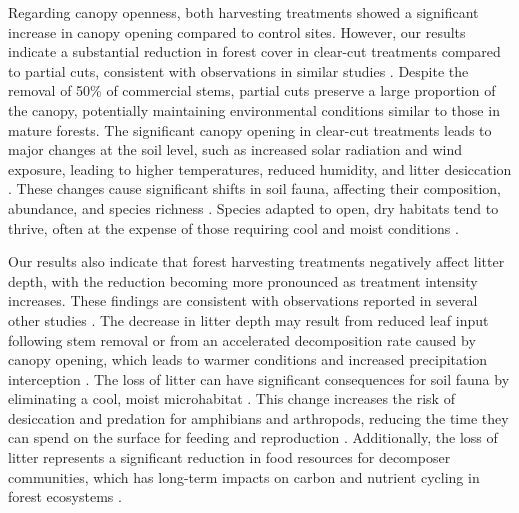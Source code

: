 
Regarding canopy openness, both harvesting treatments showed a significant increase in canopy opening compared to control sites.  
However, our results indicate a substantial reduction in forest cover in clear-cut treatments compared to partial cuts, consistent with observations in similar studies \citep{Nolet2018Comparingeffects,Mazerolle2021Woodlandsalamander}.  
Despite the removal of 50\% of commercial stems, partial cuts preserve a large proportion of the canopy, potentially maintaining environmental conditions similar to those in mature forests.  
The significant canopy opening in clear-cut treatments leads to major changes at the soil level, such as increased solar radiation and wind exposure, leading to higher temperatures, reduced humidity, and litter desiccation \citep{Keenan1993ecologicaleffects,Chen1999MicroclimateForest,Lindo2003Microbialbiomass,Brooks2008Forestfloor}.  
These changes cause significant shifts in soil fauna, affecting their composition, abundance, and species richness \citep{Staab2023Insectdecline}.  
Species adapted to open, dry habitats tend to thrive, often at the expense of those requiring cool and moist conditions \citep{Niemela2007effectsforestry,Ochs2022Responseterrestrial,Staab2023Insectdecline}.




Our results also indicate that forest harvesting treatments negatively affect litter depth, with the reduction becoming more pronounced as treatment intensity increases.  
These findings are consistent with observations reported in several other studies \citep{Marshall2000Impactsforest,Mazerolle2021Woodlandsalamander}.  
The decrease in litter depth may result from reduced leaf input following stem removal or from an accelerated decomposition rate caused by canopy opening, 
which leads to warmer conditions and increased precipitation interception \citep{Fierer2005LitterQuality,Butenschoen2011Interactiveeffects,Ameray2021Forestcarbon}.  
The loss of litter can have significant consequences for soil fauna by eliminating a cool, moist microhabitat \citep{spotilaRoleTemperatureWater1972,groverInfluenceCoverMoisture1998a,Niemela2007effectsforestry}.  
This change increases the risk of desiccation and predation for amphibians and arthropods, reducing the time they can spend on the surface for feeding and reproduction \citep{deMaynadier1995relationshipforest,koivula.LeafLitterSmallscale1999,Walton2013Topdownregulation}.  
Additionally, the loss of litter represents a significant reduction in food resources for decomposer communities, which has long-term impacts on carbon and nutrient cycling in forest ecosystems \citep{Handa2014Consequencesbiodiversity}.  


